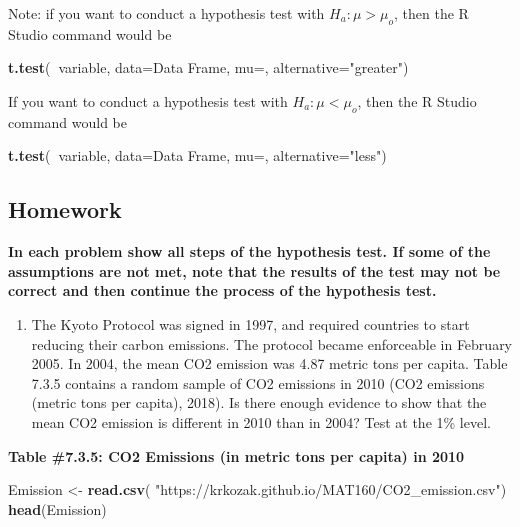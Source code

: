 \documentclass[
]{book}
\newenvironment{Shaded}{\begin{snugshade}}{\end{snugshade}}
\newcommand{\DataTypeTok}[1]{\textcolor[rgb]{0.13,0.29,0.53}{#1}}
\newcommand{\KeywordTok}[1]{\textcolor[rgb]{0.13,0.29,0.53}{\textbf{#1}}}
\newcommand{\NormalTok}[1]{#1}
\newcommand{\OperatorTok}[1]{\textcolor[rgb]{0.81,0.36,0.00}{\textbf{#1}}}
\newcommand{\StringTok}[1]{\textcolor[rgb]{0.31,0.60,0.02}{#1}}
\providecommand{\tightlist}{%
  \setlength{\itemsep}{0pt}\setlength{\parskip}{0pt}}
\begin{document}
Note: if you want to conduct a hypothesis test with \(H_a:\mu>\mu_o\), then the R Studio command would be

\begin{Shaded}
\begin{Highlighting}[]
\KeywordTok{t.test}\NormalTok{(}\OperatorTok{~}\NormalTok{variable, }\DataTypeTok{data=}\NormalTok{Data Frame, }\DataTypeTok{mu=}\NormalTok{, }\DataTypeTok{alternative=}\StringTok{"greater"}\NormalTok{)}
\end{Highlighting}
\end{Shaded}

If you want to conduct a hypothesis test with \(H_a:\mu<\mu_o\), then the R Studio command would be

\begin{Shaded}
\begin{Highlighting}[]
\KeywordTok{t.test}\NormalTok{(}\OperatorTok{~}\NormalTok{variable, }\DataTypeTok{data=}\NormalTok{Data Frame, }\DataTypeTok{mu=}\NormalTok{, }\DataTypeTok{alternative=}\StringTok{"less"}\NormalTok{)}
\end{Highlighting}
\end{Shaded}

\hypertarget{homework-2}{%
\subsection{Homework}\label{homework-2}}

\textbf{In each problem show all steps of the hypothesis test. If some of the assumptions are not met, note that the results of the test may not be correct and then continue the process of the hypothesis test.}

\begin{enumerate}
\def\labelenumi{\arabic{enumi}.}
\tightlist
\item
  The Kyoto Protocol was signed in 1997, and required countries to start reducing their carbon emissions. The protocol became enforceable in February 2005. In 2004, the mean CO2 emission was 4.87 metric tons per capita. Table 7.3.5 contains a random sample of CO2 emissions in 2010 (CO2 emissions (metric tons per capita), 2018). Is there enough evidence to show that the mean CO2 emission is different in 2010 than in 2004? Test at the 1\% level.
\end{enumerate}

\textbf{Table \#7.3.5: CO2 Emissions (in metric tons per capita) in 2010}

\begin{Shaded}
\begin{Highlighting}[]
\NormalTok{Emission <-}\StringTok{ }\KeywordTok{read.csv}\NormalTok{(}
  \StringTok{"https://krkozak.github.io/MAT160/CO2_emission.csv"}\NormalTok{)}
\KeywordTok{head}\NormalTok{(Emission)}
\end{Highlighting}
\end{Shaded}
\end{document}
